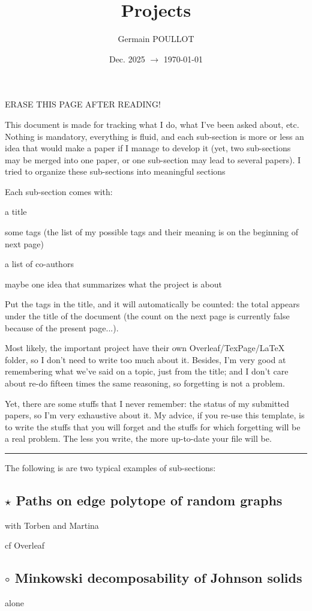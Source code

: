 \documentclass{article}
\title{Projects}
\author{Germain POULLOT}
\date{Dec. 2025 $\to$ \today}
\let\oldsubsection\subsection
\renewcommand{\subsection}{\stepcounter{nbProjects}\oldsubsection}
\begin{document}
ERASE THIS PAGE AFTER READING!

\bigskip

This document is made for tracking what I do, what I've been asked about, etc.
Nothing is mandatory, everything is fluid, and each sub-section is more or less an idea that would make a paper if I manage to develop it (yet, two sub-sections may be merged into one paper, or one sub-section may lead to several papers).
I tried to organize these sub-sections into meaningful sections

Each sub-section comes with:
\begin{compactitem}
\item a title
\item some tags (the list of my possible tags and their meaning is on the beginning of next page)
\item a list of co-authors
\item maybe one idea that summarizes what the project is about
\end{compactitem}
Put the tags in the title, and it will automatically be counted: the total appears under the title of the document (the count on the next page is currently false because of the present page...).

Most likely, the important project have their own Overleaf/TexPage/LaTeX folder, so I don't need to write too much about it.
Besides, I'm very good at remembering what we've said on a topic, just from the title; and I don't care about re-do fifteen times the same reasoning, so forgetting is not a problem.

Yet, there are some stuffs that I never remember: the status of my submitted papers, so I'm very exhaustive about it.
My advice, if you re-use this template, is to write the stuffs that you will forget and the stuffs for which forgetting will be a real problem.
The less you write, the more up-to-date your file will be.

\hrule
\medskip

The following is are two typical examples of sub-sections:

\subsection*{$\star$ Paths on edge polytope of random graphs}
with Torben and Martina

cf Overleaf


\subsection*{$\circ$ Minkowski decomposability of Johnson solids}
alone
\end{document}
